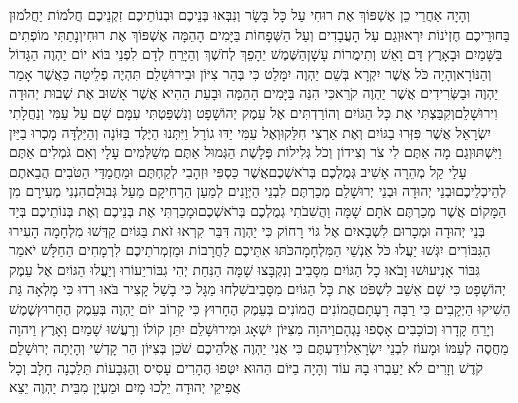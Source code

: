 \documentclass[../main/main.tex]{subfiles}
\begin{document}
\begin{multicols}{\ncols}
וְהָיָה אַחֲרֵי כֵן אֶשְׁפּוֹךְ אֶת רוּחִי עַל כָּל בָּשָׂר וְנִבְּאוּ בְּנֵיכֶם וּבְנוֹתֵיכֶם זִקְנֵיכֶם חֲלֹמוֹת יַחֲלֹמוּן בַּחוּרֵיכֶם חֶזְיֹנוֹת יִרְאוּ\PreVerseSpace{}וְגַם עַל הָעֲבָדִים וְעַל הַשְּׁפָחוֹת בַּיָּמִים הָהֵמָּה אֶשְׁפּוֹךְ אֶת רוּחִי\PreVerseSpace{}וְנָתַתִּי מוֹפְתִים בַּשָּׁמַיִם וּבָאָרֶץ דָּם וָאֵשׁ וְתִימֲרוֹת עָשָׁן\PreVerseSpace{}הַשֶּׁמֶשׁ יֵהָפֵךְ לְחֹשֶׁךְ וְהַיָּרֵחַ לְדָם לִפְנֵי בּוֹא יוֹם יַהְוֶה הַגָּדוֹל וְהַנּוֹרָא\PreVerseSpace{}וְהָיָה כֹּל אֲשֶׁר יִקְרָא בְּשֵׁם יַהְוֶה יִמָּלֵט כִּי בְּהַר צִיּוֹן וּבִירוּשָׁלֵם תִּהְיֶה פְלֵיטָה כַּאֲשֶׁר אָמַר יַהְוֶה וּבַשְּׂרִידִים אֲשֶׁר יַהְוֶה קֹרֵא\PreChapterSpace{}כִּי הִנֵּה בַּיָּמִים הָהֵמָּה וּבָעֵת הַהִיא אֲשֶׁר אָשׁוּב אֶת שְׁבוּת יְהוּדָה וִירוּשָׁלֵם\PreVerseSpace{}וְקִבַּצְתִּי אֶת כָּל הַגּוֹיִם וְהוֹרַדְתִּים אֶל עֵמֶק יְהוֹשָׁפָט וְנִשְׁפַּטְתִּי עִמָּם שָׁם עַל עַמִּי וְנַחֲלָתִי יִשְׂרָאֵל אֲשֶׁר פִּזְּרוּ בַגּוֹיִם וְאֶת אַרְצִי חִלֵּקוּ\PreVerseSpace{}וְאֶל עַמִּי יַדּוּ גוֹרָל וַיִּתְּנוּ הַיֶּלֶד בַּזּוֹנָה וְהַיַּלְדָּה מָכְרוּ בַיַּיִן וַיִּשְׁתּוּ\PreVerseSpace{}וְגַם מָה אַתֶּם לִי צֹר וְצִידוֹן וְכֹל גְּלִילוֹת פְּלָשֶׁת הַגְּמוּל אַתֶּם מְשַׁלְּמִים עָלָי וְאִם גֹּמְלִים אַתֶּם עָלַי קַל מְהֵרָה אָשִׁיב גְּמֻלְכֶם בְּרֹאשְׁכֶם\PreVerseSpace{}אֲשֶׁר כַּסְפִּי וּזְהָבִי לְקַחְתֶּם וּמַחֲמַדַּי הַטֹּבִים הֲבֵאתֶם לְהֵיכְלֵיכֶם\PreVerseSpace{}וּבְנֵי יְהוּדָה וּבְנֵי יְרוּשָׁלֵם מְכַרְתֶּם לִבְנֵי הַיְּוָנִים לְמַעַן הַרְחִיקָם מֵעַל גְּבוּלָם\PreVerseSpace{}הִנְנִי מְעִירָם מִן הַמָּקוֹם אֲשֶׁר מְכַרְתֶּם אֹתָם שָׁמָּה וַהֲשִׁבֹתִי גְמֻלְכֶם בְּרֹאשְׁכֶם\PreVerseSpace{}וּמָכַרְתִּי אֶת בְּנֵיכֶם וְאֶת בְּנוֹתֵיכֶם בְּיַד בְּנֵי יְהוּדָה וּמְכָרוּם לִשְׁבָאיִם אֶל גּוֹי רָחוֹק כִּי יַהְוֶה דִּבֵּר \ClosedSection{}קִרְאוּ זֹאת בַּגּוֹיִם קַדְּשׁוּ מִלְחָמָה הָעִירוּ הַגִּבּוֹרִים יִגְּשׁוּ יַעֲלוּ כֹּל אַנְשֵׁי הַמִּלְחָמָה\PreVerseSpace{}כֹּתּוּ אִתֵּיכֶם לַחֲרָבוֹת וּמַזְמְרֹתֵיכֶם לִרְמָחִים הַחַלָּשׁ יֹאמַר גִּבּוֹר אָנִי\PreVerseSpace{}עוּשׁוּ וָבֹאוּ כָל הַגּוֹיִם מִסָּבִיב וְנִקְבָּצוּ שָׁמָּה הַנִּחַת יְהִי גִבּוֹר\SubEnd{}\PreVerseSpace{}יֵעוֹרוּ וְיַעֲלוּ הַגּוֹיִם אֶל עֵמֶק יְהוֹשָׁפָט כִּי שָׁם אֵשֵׁב לִשְׁפֹּט אֶת כָּל הַגּוֹיִם מִסָּבִיב\PreVerseSpace{}שִׁלְחוּ מַגָּל כִּי בָשַׁל קָצִיר בֹּאוּ רְדוּ כִּי מָלְאָה גַּת הֵשִׁיקוּ הַיְקָבִים כִּי רַבָּה רָעָתָם\PreVerseSpace{}הֲמוֹנִים הֲמוֹנִים בְּעֵמֶק הֶחָרוּץ כִּי קָרוֹב יוֹם יַהְוֶה בְּעֵמֶק הֶחָרוּץ\PreVerseSpace{}שֶׁמֶשׁ וְיָרֵחַ קָדָרוּ וְכוֹכָבִים אָסְפוּ נָגְהָם\PreVerseSpace{}וַיהוָה מִצִּיּוֹן יִשְׁאָג וּמִירוּשָׁלֵם יִתֵּן קוֹלוֹ וְרָעֲשׁוּ שָׁמַיִם וָאָרֶץ וַיהוָה מַחֲסֶה לְעַמּוֹ וּמָעוֹז לִבְנֵי יִשְׂרָאֵל\PreVerseSpace{}וִידַעְתֶּם כִּי אֲנִי יַהְוֶה אֱלֹהֵיכֶם שֹׁכֵן בְּצִיּוֹן הַר קָדְשִׁי וְהָיְתָה יְרוּשָׁלֵם קֹדֶשׁ וְזָרִים לֹא יַעַבְרוּ בָהּ עוֹד \ClosedSection{}וְהָיָה בַיּוֹם הַהוּא יִטְּפוּ הֶהָרִים עָסִיס וְהַגְּבָעוֹת תֵּלַכְנָה חָלָב וְכָל אֲפִיקֵי יְהוּדָה יֵלְכוּ מָיִם וּמַעְיָן מִבֵּית יַהְוֶה יֵצֵא 
\end{multicols}
\end{document}
